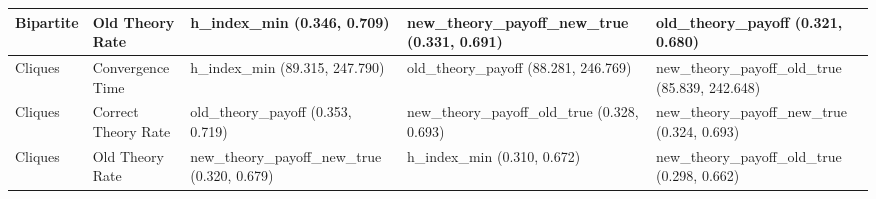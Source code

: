 \begin{table*}[htbp]
\begin{tabular}{llp{2.8cm}p{2.8cm}p{2.8cm}}
Bipartite & Old Theory Rate & h\_index\_min (0.346, 0.709) & new\_theory\_payoff\_new\_true (0.331, 0.691) & old\_theory\_payoff (0.321, 0.680) \\
\midrule
Cliques & Convergence Time & h\_index\_min (89.315, 247.790) & old\_theory\_payoff (88.281, 246.769) & new\_theory\_payoff\_old\_true (85.839, 242.648) \\
Cliques & Correct Theory Rate & old\_theory\_payoff (0.353, 0.719) & new\_theory\_payoff\_old\_true (0.328, 0.693) & new\_theory\_payoff\_new\_true (0.324, 0.693) \\
Cliques & Old Theory Rate & new\_theory\_payoff\_new\_true (0.320, 0.679) & h\_index\_min (0.310, 0.672) & new\_theory\_payoff\_old\_true (0.298, 0.662) \\
\bottomrule
\end{tabular}
\end{table*}